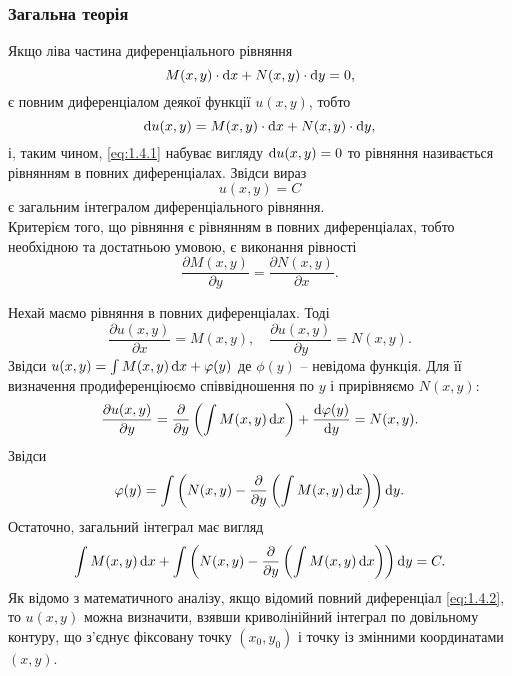 \subsubsection{Загальна теорія}
Якщо ліва частина диференціального рівняння
\begin{equation}
	\label{eq:1.4.1}
	M(x, y) \cdot \mathop{}\!\mathrm{d} x + N(x, y) \cdot \mathop{}\!\mathrm{d} y = 0,
\end{equation}
є повним диференціалом деякої функції $u(x, y)$, тобто
\begin{equation}
	\label{eq:1.4.2}
	\mathop{}\!\mathrm{d} u(x, y) = M(x, y) \cdot \mathop{}\!\mathrm{d} x + N(x, y) \cdot \mathop{}\!\mathrm{d} y,
\end{equation}
і, таким чином, \eqref{eq:1.4.1} набуває вигляду $\mathop{}\!\mathrm{d} u (x, y) = 0$ то рівняння називається рівнянням в повних диференціалах. Звідси вираз
\begin{equation}
	\label{eq:1.4.3}
	u(x, y) = C
\end{equation}
є загальним інтегралом диференціального рівняння. \\

Критерієм того, що рівняння є рівнянням в повних диференціалах, тобто необхідною та достатньою умовою, є виконання рівності
\begin{equation}
	\label{eq:1.4.4}
	\frac{\partial M(x, y)}{\partial y} = \frac{\partial N(x, y)}{\partial x}.
\end{equation}
 
Нехай маємо рівняння в повних диференціалах. Тоді
\begin{equation}
	\label{eq:1.4.5}
	\frac{\partial u(x, y)}{\partial x} = M(x, y), \quad \frac{\partial u(x, y)}{\partial y} = N(x, y).
\end{equation}
Звідси $u(x, y) = \int M(x, y) \mathop{}\!\mathrm{d} x + \varphi(y)$ де $\phi(y)$ -- невідома функція. Для її визначення продиференціюємо співвідношення по $y$ і прирівняємо $N(x, y)$:
\begin{equation}
	\label{eq:1.4.6}
	\frac{\partial u(x, y)}{\partial y} = \frac{\partial}{\partial y} \left( \int M(x, y) \mathop{}\!\mathrm{d} x \right) + \frac{\mathop{}\!\mathrm{d} \varphi(y)}{\mathop{}\!\mathrm{d} y} = N(x, y).
\end{equation}
Звідси
\begin{equation}
	\label{eq:1.4.7}
	\varphi(y) = \int \left( N(x, y) - \frac{\partial}{\partial y} \left( \int M(x, y) \mathop{}\!\mathrm{d} x \right) \right) \mathop{}\!\mathrm{d} y.
\end{equation}
Остаточно, загальний інтеграл має вигляд
\begin{equation}
	\label{eq:1.4.8}
	\int M(x, y) \mathop{}\!\mathrm{d} x + \int \left( N(x, y) - \frac{\partial}{\partial y} \left( \int M(x, y) \mathop{}\!\mathrm{d} x \right) \right) \mathop{}\!\mathrm{d} y = C.
\end{equation}
Як відомо з математичного аналізу, якщо відомий повний диференціал \eqref{eq:1.4.2}, то $u(x, y)$ можна визначити, взявши криволінійний інтеграл по довільному контуру, що з’єднує фіксовану точку $(x_0, y_0)$ і точку із змінними координатами $(x, y)$. \\

